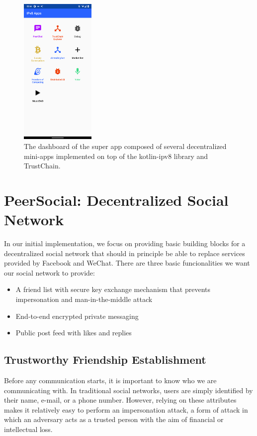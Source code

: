 \begin{figure}
    \centering
    \includegraphics[width=0.32\textwidth]{screens/superapp/superapp}
    \caption{The dashboard of the super app composed of several decentralized mini-apps implemented on top of the kotlin-ipv8 library and TrustChain.}
    \label{dashboard}
\end{figure}

\section{PeerSocial: Decentralized Social Network}

In our initial implementation, we focus on providing basic building blocks for a decentralized social network that should in principle be able to replace services provided by Facebook and WeChat. There are three basic funcionalities we want our social network to provide:

\begin{itemize}
    \item A friend list with secure key exchange mechanism that prevents impersonation and man-in-the-middle attack
    \item End-to-end encrypted private messaging
    \item Public post feed with likes and replies
\end{itemize}

\subsection{Trustworthy Friendship Establishment}

Before any communication starts, it is important to know who we are communicating with. In traditional social networks, users are simply identified by their name, e-mail, or a phone number. However, relying on these attributes makes it relatively easy to perform an impersonation attack, a form of attack in which an adversary acts as a trusted person with the aim of financial or intellectual loss.

